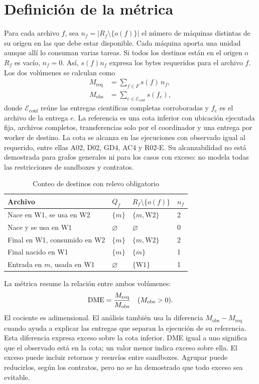 \section{Definición de la métrica}
Para cada archivo $f$, sea $n_f=\lvert R_f\setminus\{o(f)\}\rvert$ el número de máquinas distintas de su origen en las que debe estar disponible. Cada máquina aporta una unidad aunque allí lo consuman varias tareas. Si todos los destinos están en el origen o $R_f$ es vacío, $n_f=0$. Así, $s(f)n_f$ expresa los bytes requeridos para el archivo $f$. Los dos volúmenes se calculan como
\begin{align}
M_{\mathrm{req}}&=\sum_{f\in F}s(f)\,n_f,\label{eq:requerido}\\
M_{\mathrm{obs}}&=\sum_{e\in\mathcal E_{\mathrm{conf}}}s(f_e),\label{eq:observado}
\end{align}
donde $\mathcal E_{\mathrm{conf}}$ reúne las entregas científicas completas corroboradas y $f_e$ es el archivo de la entrega $e$. La referencia es una cota inferior con ubicación ejecutada fija, archivos completos, transferencias solo por el coordinador y una entrega por worker de destino. La cota se alcanza en las ejecuciones con observado igual al requerido, entre ellas A02, D02, GD4, AC4 y R02-E. Su alcanzabilidad no está demostrada para grafos generales ni para los casos con exceso: no modela todas las restricciones de sandboxes y contratos.

\begin{table}[htbp]\centering\small
\caption{Conteo de destinos con relevo obligatorio}\label{tab:ejemplos_relevo}
\begin{tabularx}{\linewidth}{@{}Ylll@{}}
\toprule Archivo & $Q_f$ & $R_f\setminus\{o(f)\}$ & $n_f$\\\midrule
Nace en W1, se usa en W2 & $\{m\}$ & $\{m,\mathrm{W2}\}$ & 2\\
Nace y se usa en W1 & $\varnothing$ & $\varnothing$ & 0\\
Final en W1, consumido en W2 & $\{m\}$ & $\{m,\mathrm{W2}\}$ & 2\\
Final nacido en W1 & $\{m\}$ & $\{m\}$ & 1\\
Entrada en $m$, usada en W1 & $\varnothing$ & $\{\mathrm{W1}\}$ & 1\\
\bottomrule\end{tabularx}
\end{table}

La métrica resume la relación entre ambos volúmenes:
\begin{equation}
\mathrm{DME}=\frac{M_{\mathrm{req}}}{M_{\mathrm{obs}}}\quad (M_{\mathrm{obs}}>0).
\label{eq:dme}
\end{equation}
El cociente es adimensional. El análisis también usa la diferencia $M_{\mathrm{obs}}-M_{\mathrm{req}}$ cuando ayuda a explicar las entregas que separan la ejecución de su referencia. Esta diferencia expresa exceso sobre la cota inferior. DME igual a uno significa que el observado está en la cota; un valor menor indica exceso sobre ella. El exceso puede incluir retornos y reenvíos entre sandboxes. Agrupar puede reducirlos, según los contratos, pero no se ha demostrado que todo exceso sea evitable.


